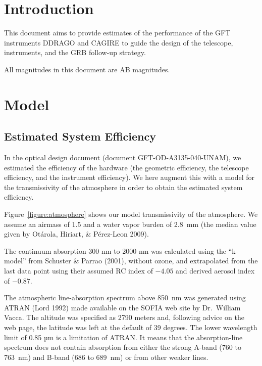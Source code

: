 \documentclass{article}
\begin{document}
\newpage

\pagestyle{plain}

\tableofcontents
\newpage

\section{Introduction}

This document aims to provide estimates of the performance of the GFT instruments DDRAGO and CAGIRE to guide the design of the telescope, instruments, and the GRB follow-up strategy.

All magnitudes in this document are AB magnitudes.

\section{Model}

\subsection{Estimated System Efficiency}

In the optical design document (document GFT-OD-A3135-040-UNAM), we estimated the efficiency of the hardware (the geometric efficiency, the telescope efficiency, and the instrument efficiency). We here augment this with a model for the transmissivity of the atmosphere in order to obtain the estimated system efficiency.

Figure~\ref{figure:atmosphere} shows our model transmissivity of the atmosphere. We assume an airmass of 1.5 and a water vapor burden of 2.8~mm (the median value given by Otárola, Hiriart, \& Pérez-Leon 2009).

The continuum absorption 300 nm to 2000 nm was calculated using the “k-model” from Schuster \& Parrao (2001), without ozone, and extrapolated from the last data point using their assumed RC index of $-4.05$ and derived aerosol index of $-0.87$. 

The atmospheric line-absorption spectrum above 850~nm was generated using ATRAN (Lord 1992) made available on the SOFIA web site by Dr.\ William Vacca. The altitude was specified as 2790 meters and, following advice on the web page, the latitude was left at the default of 39 degrees. The lower wavelength limit of 0.85 µm is a limitation of ATRAN. It means that the absorption-line spectrum does not contain absorption from either the strong A-band (760 to 763~nm) and B-band (686 to 689~nm) or from other weaker lines.
\end{document}
